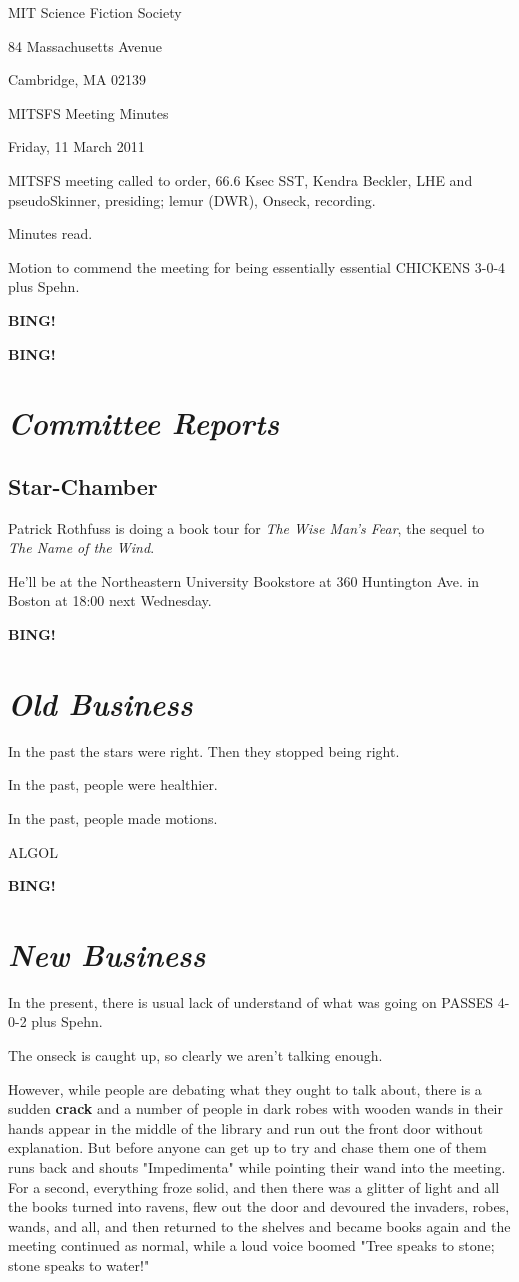 \documentclass[10pt]{article}
\newcommand{\bing}{{\bf BING!} }
\newcommand{\goto}[1]{\bing \vskip 12pt \section*{{\em{#1}}}}
\newcommand{\ps}{ plus Spehn\xspace}
\newcommand{\skinner}{Kendra Beckler, LHE and pseudoSkinner}
\newcommand{\onseck}{lemur (DWR), Onseck}
\newcommand{\meetingdate}{Friday, 11 March 2011}
\begin{document}
\begin{center}

MIT Science Fiction Society

84 Massachusetts Avenue

Cambridge, MA 02139

\vspace{12pt}

MITSFS Meeting Minutes

\meetingdate

\end{center}

\vspace{18pt}

\setlength{\parskip}{6pt}

\noindent
MITSFS meeting called to order, 66.6 Ksec SST,
\skinner, presiding; \onseck, recording.

Minutes read.

Motion to commend the meeting for being essentially essential
CHICKENS 3-0-4\ps.

\bing

\goto{Committee Reports}

\subsection*{Star-Chamber}

Patrick Rothfuss is doing a book tour for \emph{The Wise
Man's Fear}, the sequel to \emph{The Name of the Wind}.

He'll be at the Northeastern University Bookstore at
360 Huntington Ave. in Boston at 18:00 next Wednesday.

\goto{Old Business}

In the past the stars were right.  Then they stopped being right.

In the past, people were healthier.

In the past, people made motions.

ALGOL

\goto{New Business}

In the present, there is usual lack of understand of what was
going on PASSES 4-0-2\ps.

The onseck is caught up, so clearly we aren't talking enough.

However, while people are debating what they ought to talk about,
there is a sudden \textbf{crack} and a number of people in dark
robes with wooden wands in their hands appear in the middle of the 
library and run out the front door without explanation.  But
before anyone can get up to try and chase them one of them runs
back and shouts "Impedimenta" while pointing their wand into the
meeting.  For a second, everything froze solid, and then there was
a glitter of light and all the books turned into ravens, flew
out the door and devoured the invaders, robes, wands, and all,
and then returned to the shelves and became books again and the
meeting continued as normal, while a loud voice boomed "Tree
speaks to stone; stone speaks to water!"
\end{document}
